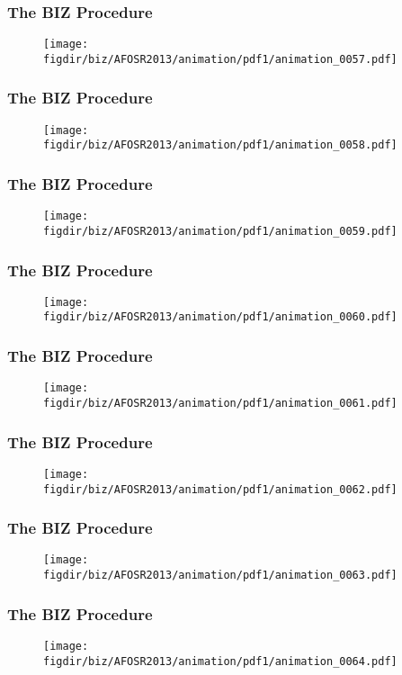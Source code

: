 \documentclass[13pt]{beamer}
\newcommand{\figdir}{../../fig}
\begin{document}
{\begin{frame}\frametitle{The BIZ Procedure}\begin{figure}\texttt{[image: \\figdir/biz/AFOSR2013/animation/pdf1/animation\_0057.pdf]}\end{figure}\end{frame}
\begin{frame}\frametitle{The BIZ Procedure}\begin{figure}\texttt{[image: \\figdir/biz/AFOSR2013/animation/pdf1/animation\_0058.pdf]}\end{figure}\end{frame}
\begin{frame}\frametitle{The BIZ Procedure}\begin{figure}\texttt{[image: \\figdir/biz/AFOSR2013/animation/pdf1/animation\_0059.pdf]}\end{figure}\end{frame}
\begin{frame}\frametitle{The BIZ Procedure}\begin{figure}\texttt{[image: \\figdir/biz/AFOSR2013/animation/pdf1/animation\_0060.pdf]}\end{figure}\end{frame}
\begin{frame}\frametitle{The BIZ Procedure}\begin{figure}\texttt{[image: \\figdir/biz/AFOSR2013/animation/pdf1/animation\_0061.pdf]}\end{figure}\end{frame}
\begin{frame}\frametitle{The BIZ Procedure}\begin{figure}\texttt{[image: \\figdir/biz/AFOSR2013/animation/pdf1/animation\_0062.pdf]}\end{figure}\end{frame}
\begin{frame}\frametitle{The BIZ Procedure}\begin{figure}\texttt{[image: \\figdir/biz/AFOSR2013/animation/pdf1/animation\_0063.pdf]}\end{figure}\end{frame}
\begin{frame}\frametitle{The BIZ Procedure}\begin{figure}\texttt{[image: \\figdir/biz/AFOSR2013/animation/pdf1/animation\_0064.pdf]}\end{figure}\end{frame}
}
\end{document}
